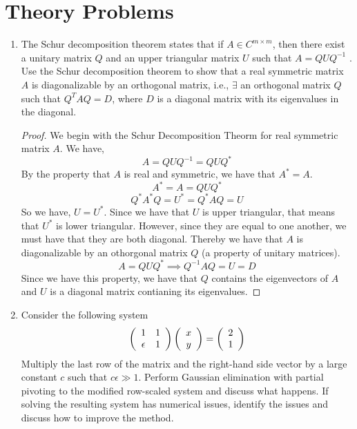 \documentclass{article}
\begin{document}
\section{Theory Problems}
\begin{enumerate}

\item %
The Schur decomposition theorem states that if $A \in C^{m\times m}$, then there
exist a unitary matrix $Q$ and an upper triangular matrix $U$ such that
$A = QUQ^{-1}$ . Use the Schur decomposition theorem to show that a real
symmetric matrix $A$ is diagonalizable by an orthogonal matrix, i.e., $\exists$ an
orthogonal matrix $Q$ such that $Q^T AQ = D$, where $D$ is a diagonal matrix
with its eigenvalues in the diagonal.

\begin{proof}

We begin with the Schur Decomposition Theorm for real symmetric matrix $A$. We have, 
\[
    A = QUQ^{-1} = QUQ^*
\]
By the property that $A$ is real and symmetric, we have that $A^* = A$.
\[
    A^* = A = QUQ^*
\]
\[
    Q^*A^*Q = U^* = Q^*AQ = U
\]
So we have, $U = U^*$. Since we have that $U$ is upper triangular, that means that $U^*$ is lower triangular. However, since they are equal to one another, we must have that they are both diagonal. Thereby we have that $A$ is diagonalizable by an othorgonal matrix $Q$ (a property of unitary matrices).
\[
    A = QUQ^* \implies Q^{-1}AQ = U = D
\]
Since we have this property, we have that $Q$ contains the eigenvectors of $A$ and $U$ is a diagonal matrix contianing its eigenvalues. 

\end{proof}

\item
Consider the following system
\[
\left(\begin{array}{c c}
1 & 1 \\
\epsilon & 1 
\end{array}\right) \left(\begin{array}{c}
x \\
y
\end{array}\right) = \left(\begin{array}{c}
2 \\ 
1
\end{array}\right) 
\]
Multiply the last row of the matrix and the right-hand side vector by a large
constant $c$ such that $c\epsilon \gg 1$. Perform Gaussian elimination with partial
pivoting to the modified row-scaled system and discuss what happens. If
solving the resulting system has numerical issues, identify the issues and
discuss how to improve the method.


\end{enumerate}
\end{document}
